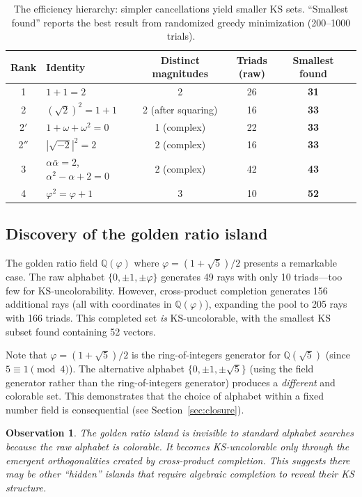 \documentclass[12pt,a4paper]{article}
\newtheorem{observation}[theorem]{Observation}
\newcommand{\Q}{\mathbb{Q}}
\begin{document}
\begin{table}[ht]
\centering
\caption{The efficiency hierarchy: simpler cancellations yield smaller KS sets. ``Smallest found'' reports the best result from randomized greedy minimization (200--1000 trials).}
\label{tab:hierarchy}
\begin{tabular}{clcccc}
\toprule
Rank & Identity & Distinct magnitudes & Triads (raw) & Smallest found \\
\midrule
1 & $1 + 1 = 2$ & 2 & 26 & \textbf{31} \\
2 & $(\sqrt{2})^2 = 1 + 1$ & 2 (after squaring) & 16 & \textbf{33} \\
2$'$ & $1 + \omega + \omega^2 = 0$ & 1 (complex) & 22 & \textbf{33} \\
2$''$ & $|\sqrt{-2}|^2 = 2$ & 2 (complex) & 16 & \textbf{33} \\
3 & $\alpha\bar\alpha = 2$, $\alpha^2 - \alpha + 2 = 0$ & 2 (complex) & 42 & \textbf{43} \\
4 & $\varphi^2 = \varphi + 1$ & 3 & 10 & \textbf{52} \\
\bottomrule
\end{tabular}
\end{table}

\subsection{Discovery of the golden ratio island}\label{sec:golden}

The golden ratio field $\Q(\varphi)$ where $\varphi = (1 + \sqrt{5})/2$ presents a remarkable case. The raw alphabet $\{0, \pm 1, \pm\varphi\}$ generates 49 rays with only 10 triads---too few for KS-uncolorability. However, cross-product completion generates 156 additional rays (all with coordinates in $\Q(\varphi)$), expanding the pool to 205 rays with 166 triads. This completed set \emph{is} KS-uncolorable, with the smallest KS subset found containing 52 vectors.

Note that $\varphi = (1+\sqrt{5})/2$ is the ring-of-integers generator for $\Q(\sqrt{5})$ (since $5 \equiv 1 \pmod{4}$). The alternative alphabet $\{0, \pm 1, \pm\sqrt{5}\}$ (using the field generator rather than the ring-of-integers generator) produces a \emph{different} and colorable set. This demonstrates that the choice of alphabet within a fixed number field is consequential (see Section~\ref{sec:closure}).

\begin{observation}\label{obs:golden}
The golden ratio island is invisible to standard alphabet searches because the raw alphabet is colorable. It becomes KS-uncolorable only through the emergent orthogonalities created by cross-product completion. This suggests there may be other ``hidden'' islands that require algebraic completion to reveal their KS structure.
\end{observation}
\end{document}

